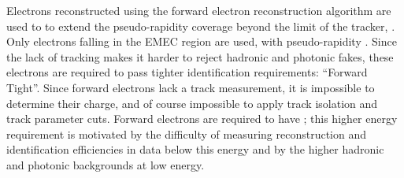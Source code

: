 Electrons reconstructed using the forward electron reconstruction algorithm are
used to to extend the pseudo-rapidity coverage beyond the limit of the tracker,
. Only electrons falling in the EMEC region are used, with
pseudo-rapidity .  Since the lack of tracking makes it
harder to reject hadronic and photonic fakes, these electrons are required to
pass tighter identification requirements: ``Forward Tight''. Since forward
electrons lack a track measurement, it is impossible to determine their charge,
and of course impossible to apply track isolation and track parameter cuts.
Forward electrons are required to have ; this higher energy requirement
is motivated by the difficulty of measuring reconstruction and identification
efficiencies in data below this energy and by the higher hadronic and photonic
backgrounds at low energy.

